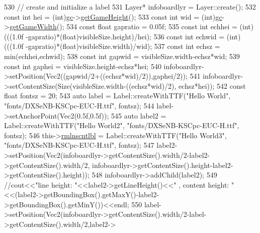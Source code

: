\begin{DoxyCode}
530     \textcolor{comment}{// create and initialize a label}
531     Layer* infoboardlyr = Layer::create();
532     \textcolor{keyword}{const} \textcolor{keywordtype}{int} hei = (int)\hyperlink{class_hello_world_a547cb213126911d9a7151f8259dc7102}{gc}->\hyperlink{class_tetris_1_1_game_controller_a10163479e02572450b886ff0654078b4}{getGameHeight}();
533     \textcolor{keyword}{const} \textcolor{keywordtype}{int} wid = (int)\hyperlink{class_hello_world_a547cb213126911d9a7151f8259dc7102}{gc}->\hyperlink{class_tetris_1_1_game_controller_a256cff75224efe165e1c5409c69b0503}{getGameWidth}();
534     \textcolor{keyword}{const} \textcolor{keywordtype}{float} gapratio = 0.05f;
535     \textcolor{keyword}{const} \textcolor{keywordtype}{int} echhei = (int)(((1.0f -gapratio)*(\textcolor{keywordtype}{float})visibleSize.height)/hei);
536     \textcolor{keyword}{const} \textcolor{keywordtype}{int} echwid =  (int)(((1.0f -gapratio)*(float)visibleSize.width)/wid);
537     \textcolor{keyword}{const} \textcolor{keywordtype}{int} echsz = min(echhei,echwid);
538     \textcolor{keyword}{const} \textcolor{keywordtype}{int} gapwid = visibleSize.width-echsz*wid;
539     \textcolor{keyword}{const} \textcolor{keywordtype}{int} gaphei = visibleSize.height-echsz*hei;
540     infoboardlyr->setPosition(Vec2((gapwid/2+((echsz*wid)/2)),gaphei/2));
541     infoboardlyr->setContentSize(Size(visibleSize.width-((echsz*wid)/2), echsz*hei));
542     \textcolor{keyword}{const} \textcolor{keywordtype}{float} fontsz = 20;
543     \textcolor{keyword}{auto} label = Label::createWithTTF(\textcolor{stringliteral}{"Hello World"}, \textcolor{stringliteral}{"fonts/DXSeNB-KSCpc-EUC-H.ttf"}, fontsz);
544     label->setAnchorPoint(Vec2(0.5f,0.5f));
545     \textcolor{keyword}{auto} label2 = Label::createWithTTF(\textcolor{stringliteral}{"Hello World2"}, \textcolor{stringliteral}{"fonts/DXSeNB-KSCpc-EUC-H.ttf"}, fontsz);
546     this->\hyperlink{class_hello_world_a52aca4f2a78e6413ace505d313b006fc}{rmlnscntlbl} = Label::createWithTTF(\textcolor{stringliteral}{"Hello World3"}, \textcolor{stringliteral}{"fonts/DXSeNB-KSCpc-EUC-H.ttf"}, 
      fontsz);
547     label2->setPosition(Vec2(infoboardlyr->getContentSize().width/2-label2->getContentSize().width/2,
      infoboardlyr->getContentSize().height-label2->getContentSize().height));
548     infoboardlyr->addChild(label2);
549     \textcolor{comment}{//cout<<"line height: "<<label2->getLineHeight()<<" , content height:
       "<<(label2->getBoundingBox().getMaxY()-label2->getBoundingBox().getMinY())<<endl;}
550     label->setPosition(Vec2(infoboardlyr->getContentSize().width/2-label->getContentSize().width/2,label2->

\end{DoxyCode}
